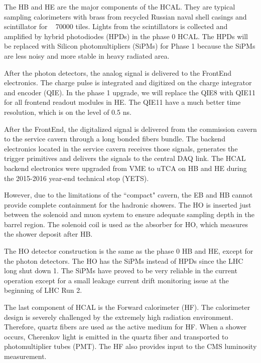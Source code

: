The HB and HE are the major components of the HCAL. They are typical sampling calorimeters with brass from recycled Russian naval shell casings and scintillator for ~ 70000 tiles. Lights from the scintillators is collected and amplified by hybrid photodiodes (HPDs) in the phase 0 HCAL. The HPDs will be replaced with Silicon photomultipliers (SiPMs) for Phase 1 because the SiPMs are less noisy and more stable in heavy radiated area. 

After the photon detectors, the analog signal is delivered to the FrontEnd electronics. The charge pulse is integrated and digitized on the charge integrator and encoder (QIE). In the phase 1 upgrade, we will replace the QIE8 with QIE11 for all frontend readout modules in HE. The QIE11 have a much better time resolution, which is on the level of 0.5 ns. 

After the FrontEnd, the digitalized signal is delivered from the commission cavern to the service cavern through a long bonded fibers bundle. The backend electronics located in the service cavern receives those signals, generates the trigger primitives and delivers the signals to the central DAQ link. The HCAL backend electronics were upgraded from VME to uTCA on HB and HE during the 2015-2016 year-end technical stop (YETS)\cite{CMS:2012tda}. 

However, due to the limitations of the ``compact" cavern, the EB and HB cannot provide complete containment for the hadronic showers. The HO is inserted just between the solenoid and muon system to ensure adequate sampling depth in the barrel region. The solenoid coil is used as the absorber for HO, which measures the shower deposit after HB. 

The HO detector construction is the same as the phase 0 HB and HE, except for the photon detectors. The HO has the SiPMs instead of HPDs since the LHC long shut down 1. The SiPMs have proved to be very reliable in the current operation except for a small leakage current drift monitoring issue at the beginning of LHC Run 2. 

The last component of HCAL is the Forward calorimeter (HF). The calorimeter design is severely challenged by the extremely high radiation environment. Therefore, quartz fibers are used as the active medium for HF. When a shower occurs, Cherenkov light is emitted in the quartz fiber and transported to photomultiplier tubes (PMT). The HF also provides input to the CMS luminosity measurement. 

